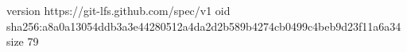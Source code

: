 version https://git-lfs.github.com/spec/v1
oid sha256:a8a0a13054ddb3a3e44280512a4da2d2b589b4274cb0499c4beb9d23f11a6a34
size 79
